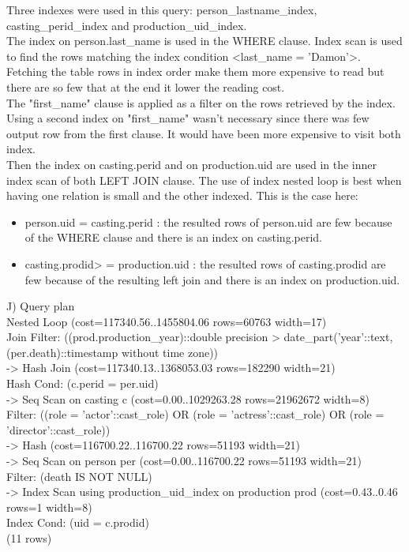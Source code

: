 \documentclass{article}
\begin{document}
Three indexes were used in this query: person_lastname_index, casting_perid_index and production_uid_index.\\

The index on person.last_name is used in the WHERE clause. Index scan is used to find the rows matching the index condition <last_name = 'Damon'>. Fetching the table rows in index order make them more expensive to read but there are so few that at the end it lower the reading cost. \\

The "first_name" clause is applied as a filter on the rows retrieved by the index. Using a second index on "first_name" wasn't necessary since there was few output row from the first clause. It would have been more expensive to visit both index. \\

Then the index on casting.perid and on production.uid are used in the inner index scan of both LEFT JOIN clause. The use of index nested loop is best when having one relation is small and the other indexed. This is the case here:
\begin{itemize}
\item \<person.uid = casting.perid\> : the resulted rows of person.uid are few because of the WHERE clause and there is an index on casting.perid.\\
\item \<casting.prodid> = production.uid : the resulted rows of casting.prodid are few because of the resulting left join and there is an index on production.uid. \\
\end{itemize}

J) Query plan \\
 Nested Loop  (cost=117340.56..1455804.06 rows=60763 width=17)\\
   Join Filter: ((prod.production_year)::double precision > date_part('year'::text, (per.death)::timestamp without time zone))\\
   ->  Hash Join  (cost=117340.13..1368053.03 rows=182290 width=21)\\
         Hash Cond: (c.perid = per.uid)\\
         ->  Seq Scan on casting c  (cost=0.00..1029263.28 rows=21962672 width=8)\\
               Filter: ((role = 'actor'::cast_role) OR (role = 'actress'::cast_role) OR (role = 'director'::cast_role))\\
         ->  Hash  (cost=116700.22..116700.22 rows=51193 width=21)\\
               ->  Seq Scan on person per  (cost=0.00..116700.22 rows=51193 width=21)\\
                     Filter: (death IS NOT NULL)\\
   ->  Index Scan using production_uid_index on production prod  (cost=0.43..0.46 rows=1 width=8)\\
         Index Cond: (uid = c.prodid)\\
(11 rows)\\
\end{document}
